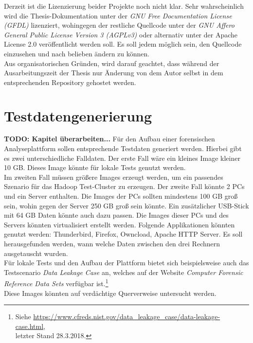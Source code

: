 \noindent
Derzeit ist die Lizenzierung beider Projekte noch nicht klar. Sehr wahrscheinlich wird die Thesis-Dokumentation unter der \textit{GNU Free Documentation License (GFDL)} lizenziert, wohingegen der restliche Quellcode unter der \textit{GNU Affero General Public License Version 3 (AGPLv3)} oder alternativ unter der Apache License 2.0 veröffentlicht werden soll. Es soll jedem möglich sein, den Quellcode einzusehen und nach belieben ändern zu können.\\

\noindent
Aus organisatorischen Gründen, wird darauf geachtet, dass während der Ausarbeitungszeit der Thesis nur Änderung von dem Autor selbst in dem entsprechenden Repository gehostet werden.\\

\section{Testdatengenerierung}
\label{testdatacreation}
\textbf{TODO: Kapitel überarbeiten...}
Für den Aufbau einer forensischen Analyseplattform sollen entsprechende Testdaten generiert werden. Hierbei gibt es zwei unterschiedliche Falldaten. Der erste Fall wäre ein kleines Image kleiner 10 GB. Dieses Image könnte für lokale Tests genutzt werden.\\
Im zweiten Fall müssen größere Images erzeugt werden, um ein passendes Szenario für das Hadoop Test-Cluster zu erzeugen. Der zweite Fall könnte 2 PCs und ein Server enthalten. Die Images der PCs sollten mindestens 100 GB groß sein, wohin gegen der Server 250 GB groß sein könnte. Ein zusätzlicher USB-Stick mit 64 GB Daten könnte auch dazu passen. Die Images dieser PCs und des Servers könnten virtualisiert erstellt werden. Folgende Applikationen könnten genutzt werden: Thunderbird, Firefox, Owncload, Apache HTTP Server. Es soll herausgefunden werden, wann welche Daten zwischen den drei Rechnern ausgetauscht wurden.\\

\noindent
Für lokale Tests und den Aufbau der Plattform bietet sich beispielsweise auch das Testscenario \textit{Data Leakage Case} an, welches auf der Website \textit{Computer Forensic Reference Data Sets} verfügbar ist.\footnote{Siehe \url{https://www.cfreds.nist.gov/data_leakage_case/data-leakage-case.html},\\ letzter Stand 28.3.2018.} \\
Diese Images könnten auf verdächtige Querverweise untersucht werden.